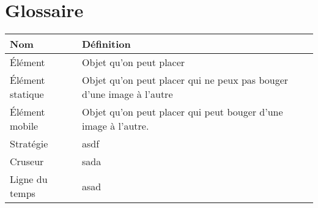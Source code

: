 \chapter{Glossaire}
\label{s:glossaire}

\begin{tabular}{|l|l|}
	\hline
	Nom & Définition \\
	\hline
	Élément & 
	Objet qu'on peut placer \\
	Élément statique & 
	Objet qu'on peut placer qui ne peux pas bouger d'une image à l'autre \\
	Élément mobile & 
	Objet qu'on peut placer qui peut bouger d'une image à l'autre. \\
	Stratégie  & 
	asdf \\
	Cruseur & 
	sada \\
	Ligne du temps & 
	asad \\
	\hline
\end{tabular}
